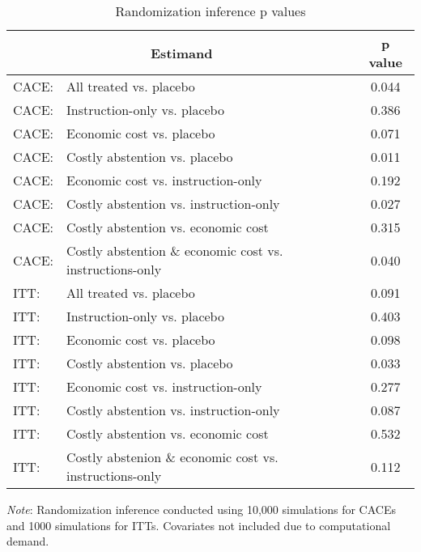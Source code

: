 \begin{table}[H]
\singlespace
\centering
\begin{tabular}{@{}llc@{}}
\toprule
\multicolumn{2}{c}{Estimand}          & p value \\ \midrule
CACE: & All treated vs. placebo       & 0.044   \\
CACE: & Instruction-only vs. placebo  & 0.386   \\
CACE: & Economic cost vs. placebo     & 0.071   \\
CACE: & Costly abstention vs. placebo & 0.011   \\
CACE: & Economic cost vs. instruction-only &   0.192 \\
CACE: & Costly abstention vs. instruction-only &  0.027 \\
CACE: & Costly abstention vs. economic cost & 0.315  \\
CACE: & Costly abstention  \& economic cost vs. instructions-only & 0.040 \\
ITT:  & All treated vs. placebo       & 0.091   \\
ITT:  & Instruction-only vs. placebo  & 0.403   \\
ITT:  & Economic cost vs. placebo     & 0.098   \\
ITT:  & Costly abstention vs. placebo & 0.033   \\ 
ITT: & Economic cost vs. instruction-only &   0.277 \\
ITT: & Costly abstention vs. instruction-only &  0.087 \\
ITT: & Costly abstention vs. economic cost & 0.532  \\
ITT: & Costly abstenion  \& economic cost vs. instructions-only & 0.112 \\
\bottomrule
\end{tabular}
\caption{Randomization inference p values}
\label{tab: ri}
\vspace{1mm}
{\textit{Note}: Randomization inference conducted using 10,000 simulations for CACEs and 1000 simulations for ITTs. Covariates not included due to computational demand.\par}
\end{table}


